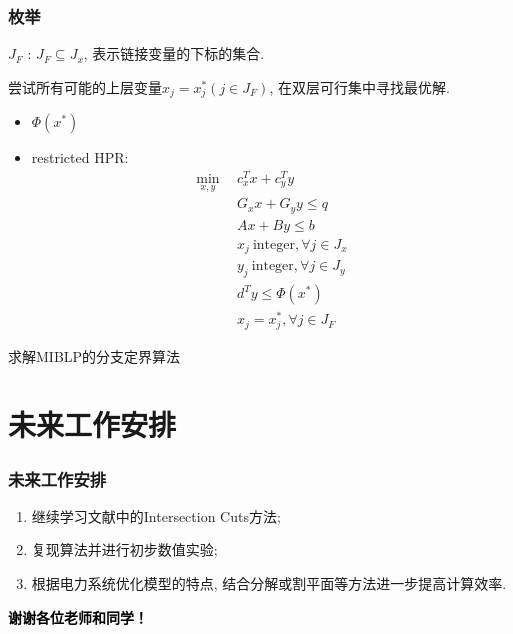 \documentclass[10pt]{beamer}
\begin{document}
\begin{frame}
	\frametitle{枚举}
	\begin{definition}
		$J_F$ : $J_F\subseteq  J_x$, 表示链接变量的下标的集合.
	\end{definition}
	尝试所有可能的上层变量$x_j=x_j^*(j\in J_F)$, 在双层可行集中寻找最优解.
	\begin{itemize}
		\item $\Phi(x^*)$
		\item restricted HPR:
		\begin{subequations}
			\begin{align}
				\min_{x,y}~~&c_{x}^{T}x+c_{y}^{T}y \\
				&G_xx+G_yy \leq q  \\
				&Ax+By\leq b\\
				&x_{j}\mathrm{~integer}, \forall j\in J_{x}  \\
				&y_{j}\mathrm{~integer}, \forall j\in J_{y} \\
				&d^{T}y\leq \Phi(x^*) \\
				&x_j=x_j^*, \forall j\in J_F
			\end{align}
		\end{subequations}
	\end{itemize}
	
\end{frame}

\begin{frame}
	\begin{algorithm}[H]
		\caption{求解MIBLP的分支定界算法}
	\end{algorithm}
\end{frame}

\section{未来工作安排}
\begin{frame}
	\frametitle{未来工作安排} 
	\begin{enumerate}
		\item 继续学习文献中的Intersection Cuts方法;
		\item 复现算法并进行初步数值实验;
		\item 根据电力系统优化模型的特点, 结合分解或割平面等方法进一步提高计算效率.
	\end{enumerate}
\end{frame}

\begin{frame}
	\vspace{1em}
	\centering
	\textcolor{black}{\LARGE\bf 谢谢各位老师和同学！}

\end{frame}
\end{document}
